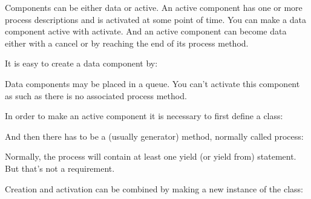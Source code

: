 \documentclass[letterpaper,10pt,english]{sphinxmanual}
\begin{document}
Components can be either data or active. An active component has one or more process descriptions and is activated
at some point of time. You can make a data component active with activate. And an active component can become
data either with a cancel or by reaching the end of its process method.

It is easy to create a data component by:

\begin{sphinxVerbatim}[commandchars=\\\{\}]
  
\end{sphinxVerbatim}

Data components may be placed in a queue. You can’t activate this component as such as there is no associated process method.

In order to make an active component it is necessary to first define a class:

\begin{sphinxVerbatim}[commandchars=\\\{\}]
 
\end{sphinxVerbatim}

And then there has to be a (usually generator) method, normally called process:

\begin{sphinxVerbatim}[commandchars=\\\{\}]
 
     
         
\end{sphinxVerbatim}

Normally, the process will contain at least one yield (or yield from) statement. But that’s not a requirement.

Creation and activation can be combined by making a new instance of the class:

\begin{sphinxVerbatim}[commandchars=\\\{\}]
  
  
  
\end{sphinxVerbatim}
\end{document}
